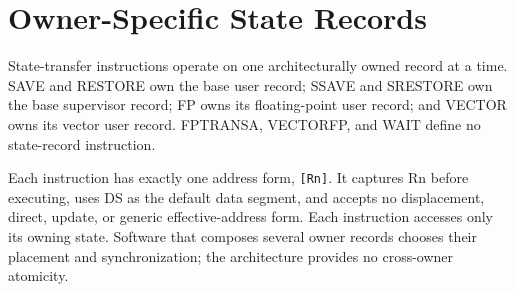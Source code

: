 \clearpage
\section{Owner-Specific State Records}\label{page:owner-specific-state-records}

State-transfer instructions operate on one architecturally owned record at a time. SAVE and RESTORE own the base user record; SSAVE and SRESTORE own the base supervisor record; FP owns its floating-point user record; and VECTOR owns its vector user record. FPTRANSA, VECTORFP, and WAIT define no state-record instruction.

Each instruction has exactly one address form, \texttt{[Rn]}. It captures Rn before executing, uses DS as the default data segment, and accepts no displacement, direct, update, or generic effective-address form. Each instruction accesses only its owning state. Software that composes several owner records chooses their placement and synchronization; the architecture provides no cross-owner atomicity.
